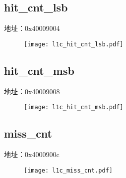 \subsection{hit\_cnt\_lsb}
\label{l1c-hit-cnt-lsb}
地址：0x40009004
 \begin{figure}[H]
\texttt{[image: l1c\_hit\_cnt\_lsb.pdf]}
\end{figure}

\subsection{hit\_cnt\_msb}
\label{l1c-hit-cnt-msb}
地址：0x40009008
 \begin{figure}[H]
\texttt{[image: l1c\_hit\_cnt\_msb.pdf]}
\end{figure}

\subsection{miss\_cnt}
\label{l1c-miss-cnt}
地址：0x4000900c
 \begin{figure}[H]
\texttt{[image: l1c\_miss\_cnt.pdf]}
\end{figure}

